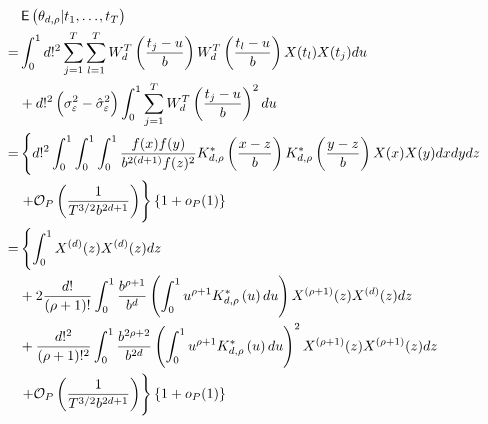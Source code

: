 \begin{equation}
\begin{split}
&\EE \left( \theta_{d,\rho}  | t_1, \dots, t_T \right) \\
=& \int_0^1 d!^2  \sum_{j=1}^{T} \sum_{l=1}^{T} W_d^T\left(\frac{t_{j}-u}{b} \right)  W_d^T\left(\frac{t_{l}-u}{b}\right) X(t_{l}) X(t_{j}) du \\ 
&+  d!^2 \left(\sigma_{\varepsilon}^2-  \hat{\sigma}_{\varepsilon}^2 \right) \int_0^1 \sum_{j=1}^{T} W_d^T\left(\frac{t_{j}-u}{b} \right)^2  du\\
=& \left\{ d!^2 \int_0^1 \int_0^1 \int_0^1 \frac{ f(x)f(y) }{ b^{2(d+1)} f(z)^2 } K_{d,\rho}^*\left( \frac{x-z}{b} \right) K_{d,\rho}^*\left(\frac{y-z}{b} \right) X(x) X(y) dx dy dz \right.\\ 
&\left.+ \mathcal{O}_P \left( \frac{1}{T^{3/2} b^{2d+1}} \right) \right\} \{ 1+ o_P(1) \} \\
=& \left\{ \int_0^1  X^{(d)}(z) X^{(d)}(z) dz \right.\\
&+ 2 \frac{d!}{(\rho+1)!} \int_0^1  \frac{ b^{\rho+1} }{ b^{d}  } \left(\int_0^1 u^{\rho+1} K_{d,\rho}^*\left( u \right) du \right) X^{(\rho+1)}(z) X^{(d)}(z)dz  \\
&+  \frac{d!^2}{(\rho+1)!^2} \int_0^1   \frac{ b^{2\rho+2} }{ b^{2d}  } \left(\int_0^1 u^{\rho+1} K_{d,\rho}^*\left( u \right) du \right)^2 X^{(\rho+1)}(z) X^{(\rho+1)}(z) dz \\
&\left.+ \mathcal{O}_P \left( \frac{1}{T^{3/2} b^{2d+1}} \right) \right\} \{ 1+ o_P(1) \}%
\end{split}
\end{equation}
